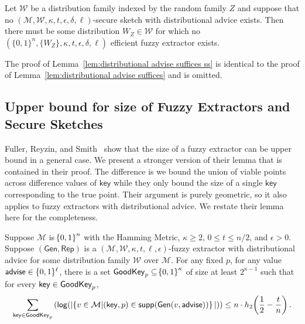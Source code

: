 \begin{lemma}
Let $\mathcal{W}$ be a distribution family indexed by the random family $Z$ and suppose that no $(\mathcal{M}, \mathcal{W}, \kappa, t, \epsilon, \delta, \ell)$-secure sketch with distributional advice exists.  Then there must be some distribution $W_Z \in \mathcal{W}$ for which no  $(\{0,1\}^n, \{W_Z\}, \kappa, t, \epsilon, \delta, \ell)$ efficient fuzzy extractor exists.
\label{lem:distributional advise suffices ss}
\end{lemma}

\noindent
The proof of Lemma~\ref{lem:distributional advise suffices ss} is identical to the proof of Lemma~\ref{lem:distributional advise suffices} and is omitted.

\subsection{Upper bound for size of Fuzzy Extractors and Secure Sketches}
Fuller, Reyzin, and Smith~\cite{fuller2016fuzzy,fuller2020fuzzy} show that the size of a fuzzy extractor can be upper bound in a general case.  We present a stronger version of their lemma that is contained in their proof.  The difference is we bound the union of viable points across difference values of $\mathsf{key}$ while they only bound the size of a single $\mathsf{key}$ corresponding to the true point.  Their argument is purely geometric, so it also applies to fuzzy extractors with distributional advice. 
We restate their lemma here for the completeness. 

\begin{lemma}
    \label{lem:smallgeneralviable}
    Suppose $\mathcal{M}$ is $\!\left\{ 0,1 \right\}^{n}$ with the Hamming Metric, $\kappa \geq 2$, $0 \leq t \leq n/2$, and $\epsilon > 0$. 
    Suppose $(\mathsf{Gen, Rep})$ is a $(\mathcal{M,W},\kappa, t, \ell, \epsilon)$-fuzzy extractor with distributional advice for some distribution family $\mathcal{W}$ over $\mathcal{M}$. 
    For any fixed $p$, for any value ${\mathsf{advise}} \in \{0, 1\}^\ell$, there is a set $\mathsf{GoodKey}_p \subseteq \!\left\{ 0,1 \right\}^{\kappa}$ of size at least $2^{\kappa - 1}$ such that for every $\mathsf{key} \in \mathsf{GoodKey}_p$,
    \[
       \sum_{\mathsf{key} \in \mathsf{GoodKey}_p} \left( \mathsf{log}\!\left(|\!\left\{ v \in \mathcal{M}|\!\left(\mathsf{key}, p\right) \in \mathsf{supp}\!\left(\mathsf{Gen}(v, {\mathsf{advise}})\right) \right\}|\right)\right) \leq n \cdot h_2\!\left(\frac{1}{2} - \frac{t}{n}\right).
    \]   
\end{lemma}

